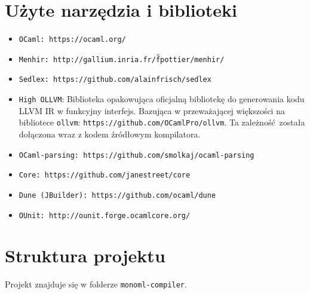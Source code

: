 \documentclass[declaration,shortabstract]{iithesis}
\begin{document}
\section{Użyte narzędzia i biblioteki}

\begin{itemize}
  \item \texttt{OCaml: https://ocaml.org/}
  \item \texttt{Menhir: http://gallium.inria.fr/\~fpottier/menhir/}
  \item \texttt{Sedlex: https://github.com/alainfrisch/sedlex}
  \item \texttt{High OLLVM}: Biblioteka opakowująca oficjalną bibliotekę do 
  generowania kodu LLVM IR w funkcyjny interfejs. Bazująca w przeważającej większości 
  na bibliotece \texttt{ollvm}: 
  \texttt{https://github.com/OCamlPro/ollvm}.
  Ta zależność została dołączona wraz z kodem źródłowym kompilatora.
  \item \texttt{OCaml-parsing: https://github.com/smolkaj/ocaml-parsing}
  \item \texttt{Core: https://github.com/janestreet/core} 
  \item \texttt{Dune (JBuilder): https://github.com/ocaml/dune} 
  \item \texttt{OUnit: http://ounit.forge.ocamlcore.org/} 
\end{itemize}



\section{Struktura projektu}

Projekt znajduje się w folderze \texttt{monoml-compiler}.
\end{document}
